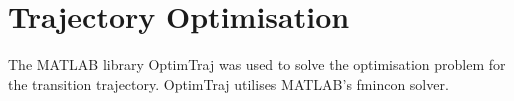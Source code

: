 \FloatBarrier

\section{Trajectory Optimisation}
\label{sec:trajopt}
The MATLAB library OptimTraj \cite{kelly2022optimtraj} was used to solve the optimisation problem for the transition trajectory. OptimTraj utilises MATLAB's fmincon solver.



